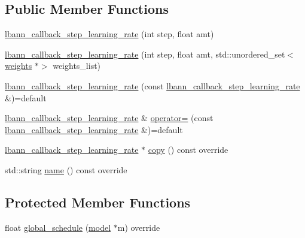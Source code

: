 \subsection*{Public Member Functions}
\begin{DoxyCompactItemize}
\item 
\hyperlink{classlbann_1_1lbann__callback__step__learning__rate_acaf6b1a65c8734b21a62a3c1f16447ca}{lbann\+\_\+callback\+\_\+step\+\_\+learning\+\_\+rate} (int step, float amt)
\item 
\hyperlink{classlbann_1_1lbann__callback__step__learning__rate_a22ece9107d7aa79c6b849b251db036b0}{lbann\+\_\+callback\+\_\+step\+\_\+learning\+\_\+rate} (int step, float amt, std\+::unordered\+\_\+set$<$ \hyperlink{classlbann_1_1weights}{weights} $\ast$$>$ weights\+\_\+list)
\item 
\hyperlink{classlbann_1_1lbann__callback__step__learning__rate_a490e371559547d9527a4dee80dabed03}{lbann\+\_\+callback\+\_\+step\+\_\+learning\+\_\+rate} (const \hyperlink{classlbann_1_1lbann__callback__step__learning__rate}{lbann\+\_\+callback\+\_\+step\+\_\+learning\+\_\+rate} \&)=default
\item 
\hyperlink{classlbann_1_1lbann__callback__step__learning__rate}{lbann\+\_\+callback\+\_\+step\+\_\+learning\+\_\+rate} \& \hyperlink{classlbann_1_1lbann__callback__step__learning__rate_a0e677a5365c5b2119520ea9efcbb0a77}{operator=} (const \hyperlink{classlbann_1_1lbann__callback__step__learning__rate}{lbann\+\_\+callback\+\_\+step\+\_\+learning\+\_\+rate} \&)=default
\item 
\hyperlink{classlbann_1_1lbann__callback__step__learning__rate}{lbann\+\_\+callback\+\_\+step\+\_\+learning\+\_\+rate} $\ast$ \hyperlink{classlbann_1_1lbann__callback__step__learning__rate_aa4848d45df5b6ab58456374ce966b374}{copy} () const override
\item 
std\+::string \hyperlink{classlbann_1_1lbann__callback__step__learning__rate_a0332449e3d03aac46e0562cede85a5ed}{name} () const override
\end{DoxyCompactItemize}
\subsection*{Protected Member Functions}
\begin{DoxyCompactItemize}
\item 
float \hyperlink{classlbann_1_1lbann__callback__step__learning__rate_a440671682e8c041a7208af77231059ec}{global\+\_\+schedule} (\hyperlink{classlbann_1_1model}{model} $\ast$m) override
\end{DoxyCompactItemize}
